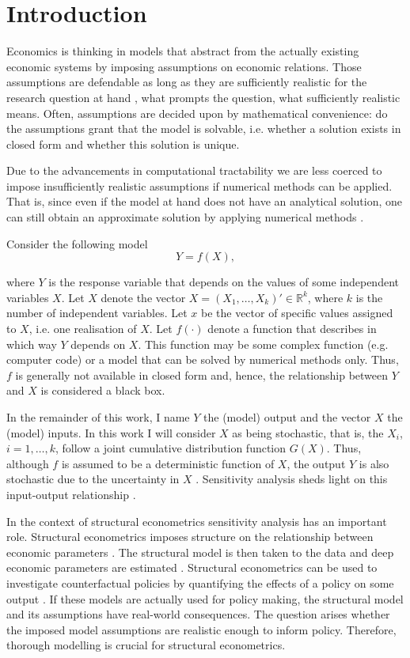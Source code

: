 \section{Introduction} \label{intro}

Economics is thinking in models that abstract from the actually existing economic systems by imposing assumptions on economic relations. Those assumptions are defendable as long as they are sufficiently realistic for the research question at hand \citep{F66}, what prompts the question, what sufficiently realistic means. Often, assumptions are decided upon by mathematical convenience: do the assumptions grant that the model is solvable, i.e. whether a solution exists in closed form and whether this solution is unique.

Due to the advancements in computational tractability we are less coerced to impose insufficiently realistic assumptions if numerical methods can be applied. That is, since even if the model at hand does not have an analytical solution, one can still obtain an approximate solution by applying numerical methods \citep{MF04}.

\noindent Consider the following model
\begin{equation*}
Y = f(X),
\end{equation*}

where $Y$ is the response variable that depends on the values of some independent variables $X$. Let $X$ denote the vector $X = (X_1, \dots, X_k)' \in \mathbb{R}^k$, where $k$ is the number of independent variables. Let $x$ be the vector of specific values assigned to $X$, i.e. one realisation of $X$. Let $f(\cdot)$ denote a function that describes in which way $Y$ depends on $X$. This function may be some complex function (e.g. computer code) or a model that can be solved by numerical methods only. Thus, $f$ is generally not available in closed form and, hence, the relationship between $Y$ and $X$ is considered a black box.

In the remainder of this work, I name $Y$ the (model) output and the vector $X$ the (model) inputs. In this work I will consider $X$ as being stochastic, that is, the $X_i$, $i = 1,\dots, k$, follow a joint cumulative distribution function $G(X)$. Thus, although $f$ is assumed to be a deterministic function of $X$, the output $Y$ is also stochastic due to the uncertainty in $X$ \citep{SNS16}. Sensitivity analysis sheds light on this input-output relationship \citep{BP16}.

In the context of structural econometrics sensitivity analysis has an important role. Structural econometrics imposes structure on the relationship between economic parameters \citep{LM17}. The structural model is then taken to the data and deep economic parameters are estimated \citep{LM17}. Structural econometrics can be used to investigate counterfactual policies by quantifying the effects of a policy on some output \citep{LM17}. If these models are actually used for policy making, the structural model and its assumptions have real-world consequences. The question arises whether the imposed model assumptions are realistic enough to inform policy. Therefore, thorough modelling is crucial for structural econometrics.

